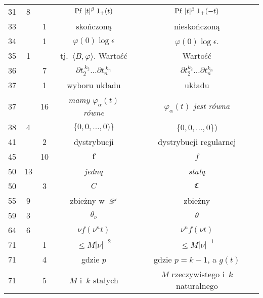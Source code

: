 \documentclass[a4paper,11pt]{article}
\numberwithin{equation}{section}
\begin{document}
\begin{center}
\begin{tabular}{|c|c|c|c|c|}
    31  &  8 & & $\operatorname{Pf} \, | t |^{ \beta } \; 1_{ + }( t )$
           & $\operatorname{Pf} \, | t |^{ \beta } \; 1_{ + }( -t )$ \\
    33  & &  1 & skończoną & nieskończoną \\
    34  & &  1 & $\varphi( 0 ) \log \epsilon$ & $\varphi( 0 ) \log \epsilon$. \\
    35 & 1 & & tj.~$\langle B, \varphi \rangle$. Wartość & Wartość \\
    36 & & 7 & $\partial t_{ 2 }^{ \: k_{ 2 } } \ldots \partial t_{ n }^{ \: k_{ n } }$
           & $\partial t_{ 2 }^{ k_{ 2 } } \ldots \partial t_{ n }^{ k_{ n } }$ \\
    37 & & 1 & wyboru układu & układu \\
    37 & & 16 & \textit{mamy $\varphi_{ \alpha }( t )$ równe}
           & \textit{$\varphi_{ \alpha }( t )$ jest równa} \\
    38  &  4 & & $\{ 0, 0, \ldots, 0 ) \}$ & $\{ 0, 0, \ldots, 0 \}$) \\
    41  & &  2 & dystrybucji & dystrybucji regularnej \\
    45  & & 10 & $\boldsymbol{f}$ & $f$ \\
    50  & 13 & & \textit{jedną} & \textit{stałą} \\
    50  & &  3 & $C$ & $\mathfrak{C}$ \\
    55  &  9 & & zbieżny w~$\mathcal{D}'$ & zbieżny \\
    59  &  3 & & $\theta_{ \nu }$ & $\theta$ \\
    64  &  6 & & $\nu f( \nu^{ n } t )$ & $\nu^{ n } f( \nu t )$ \\
    71 & & 1 & $\leq M | \nu |^{ -2 }$ & $\leq M | \nu |^{ -1 }$ \\
    71 & & 4 & gdzie $p$ & gdzie $p = k - 1$, a $g( t )$ \\
    71 & & 5 & $M$ i~$k$ stałych & $M$ rzeczywistego i~$k$ naturalnego \\
    \hline
  \end{tabular}

\end{center}
\end{document}

